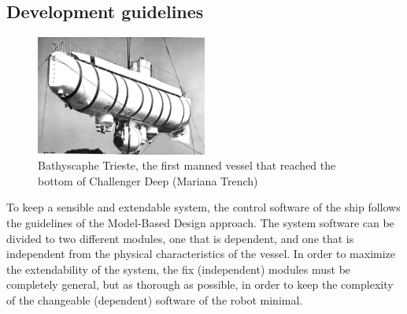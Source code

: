 \subsection*{Development guidelines}
\begin{figure}
  \begin{center}
    \includegraphics[width=0.5\textwidth]{img/trieste}
  \end{center}
  \caption{Bathyscaphe Trieste, the first manned vessel that reached the bottom of Challenger Deep (Mariana Trench)\cite{trieste}}
  \label{fig:trieste}
\end{figure}
To keep a sensible and extendable system, the control software of the ship follows the guidelines of the Model-Based Design approach. The system software can be divided to two different modules, one that is dependent, and one that is independent from the physical characteristics of the vessel. In order to maximize the extendability of the system, the fix (independent) modules must be completely general, but as thorough as possible, in order to keep the complexity of the changeable (dependent) software of the robot minimal.

